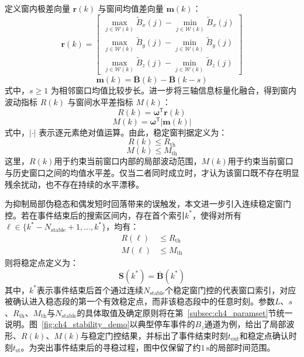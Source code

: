 \documentclass{xdupgthesis}
\begin{document}
定义窗内极差向量 $\mathbf{r}(k)$ 与窗间均值差向量 $\mathbf{m}(k)$：
\begin{equation}
    \mathbf{r}(k)=\begin{bmatrix}
        \max\limits_{j\in\mathcal{W}(k)}\widetilde{B}_x(j)-\min\limits_{j\in\mathcal{W}(k)}\widetilde{B}_x(j)\\
        \max\limits_{j\in\mathcal{W}(k)}\widetilde{B}_y(j)-\min\limits_{j\in\mathcal{W}(k)}\widetilde{B}_y(j)\\
        \max\limits_{j\in\mathcal{W}(k)}\widetilde{B}_z(j)-\min\limits_{j\in\mathcal{W}(k)}\widetilde{B}_z(j)
    \end{bmatrix}
\end{equation}
\begin{equation}
    \mathbf{m}(k)=\overline{\mathbf{B}}(k)-\overline{\mathbf{B}}(k-s)
\end{equation}
式中，$s\ge 1$ 为相邻窗口均值比较步长。进一步将三轴信息标量化融合，得到窗内波动指标 $R(k)$ 与窗间水平差指标 $M(k)$：
\begin{equation}
    R(k)=\boldsymbol{\omega}^{\mathsf{T}}\mathbf{r}(k)
\end{equation}
\begin{equation}
    M(k)=\boldsymbol{\omega}^{\mathsf{T}}\left|\mathbf{m}(k)\right|
\end{equation}
式中，$|\cdot|$ 表示逐元素绝对值运算。由此，稳定窗判据定义为：
\begin{equation}
    R(k)\le R_{\mathrm{th}}
\end{equation}
\begin{equation}
    M(k)\le M_{\mathrm{th}}
\end{equation}
这里，$R(k)$用于约束当前窗口内部的局部波动范围，$M(k)$用于约束当前窗口与历史窗口之间的均值水平差。仅当二者同时成立时，才认为该窗口既不存在明显残余扰动，也不存在持续的水平漂移。

为抑制局部伪稳态和偶发短时回落带来的误触发，本文进一步引入连续稳定窗门控。若在事件结束后的搜索区间内，存在首个索引$k^\ast$，使得对所有$\ell\in\{k^\ast-N_{\mathrm{stable}}+1,\ldots,k^\ast\}$，均有：
\begin{equation}
    \begin{aligned}
        R(\ell)&\le R_{\mathrm{th}}\\
        M(\ell)&\le M_{\mathrm{th}}
    \end{aligned}
\end{equation}
则将稳定点定义为：
\begin{equation}
    \mathbf{S}(k^\ast)=\overline{\mathbf{B}}(k^\ast)
\end{equation}
其中，$k^\ast$表示事件结束后首个通过连续$N_{\mathrm{stable}}$个稳定窗门控的代表窗口索引，对应被确认进入稳态段的第一个有效稳定点，而非该稳态段中的任意时刻。参数$L$、$s$、$R_{\mathrm{th}}$、$M_{\mathrm{th}}$与$N_{\mathrm{stable}}$的具体取值及确定原则将在第~\ref{subsec:ch4_paramset}节统一说明。图~\ref{fig:ch4_stability_demo}以典型停车事件的$B_z$通道为例，给出了局部波形、$R(k)$、$M(k)$与稳定门控结果，并标出了事件结束时刻$t_{\mathrm{out}}$和稳定点确认时刻$t_{\mathrm{st}}$。为突出事件结束后的寻稳过程，图中仅保留了约$1\,\mathrm{s}$的局部时间范围。
\end{document}
